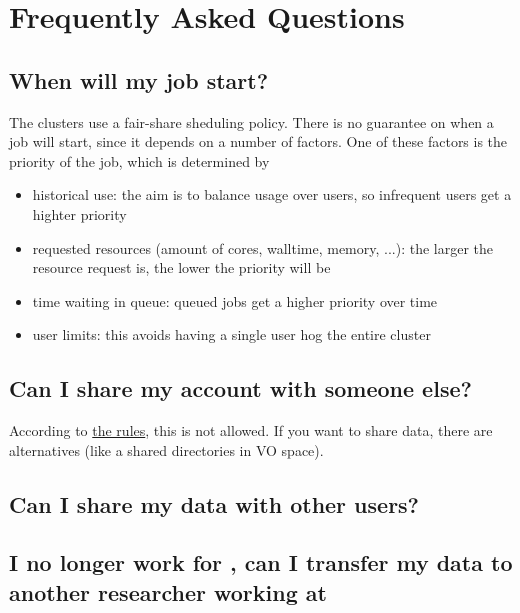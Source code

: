 \chapter{Frequently Asked Questions}
\label{ch:faq}

\section{When will my job start?}

The clusters use a fair-share sheduling policy. There is no guarantee on when a
job will start, since it depends on a number of factors. One of these factors is
the priority of the job, which is determined by
\begin{itemize}
    \item historical use: the aim is to balance usage over users, so
        infrequent users get a highter priority

    \item requested resources (amount of cores, walltime, memory, ...): the larger
        the resource request is, the lower the priority will be

    \item time waiting in queue: queued jobs get a higher priority over time

    \item user limits: this avoids having a single user hog the entire cluster

\end{itemize}

\section{Can I share my account with someone else?}

\ifgent
According to \href{https://helpdesk.ugent.be/account/en/regels.php}{the rules},
this is not allowed.
\fi %
If you want to share data, there are alternatives (like a shared
directories in VO space).

\section{Can I share my data with other \hpc users?}

\section{I no longer work for \university, can I transfer my data to another researcher working at \univerity}
